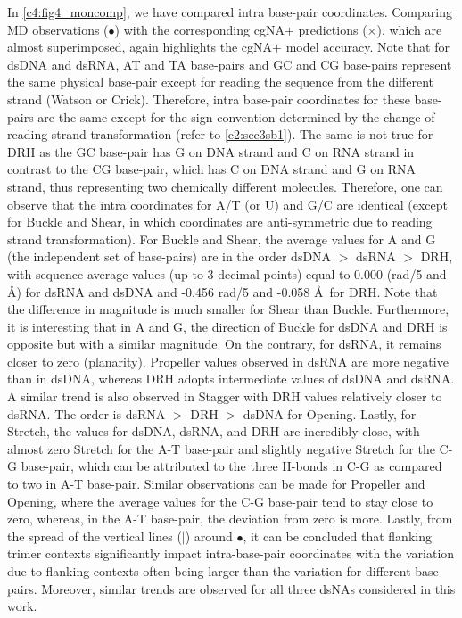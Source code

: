 In \cref{c4:fig4_moncomp}, we have compared intra base-pair coordinates. 
Comparing MD observations ($\bullet$) with the corresponding cgNA$+$ predictions ($\times$), which are almost superimposed, again highlights the cgNA$+$ model accuracy.
Note that for dsDNA and dsRNA, AT and TA base-pairs and GC and CG base-pairs represent the same physical base-pair except for reading the sequence from the different strand (Watson or Crick). 
Therefore, intra base-pair coordinates for these base-pairs are the same except for the sign convention determined by the change of reading strand transformation (refer to \cref{c2:sec3sb1}).
The same is not true for DRH as the GC base-pair has G on DNA strand and C on RNA strand in contrast to the CG base-pair, which has C on DNA strand and G on RNA strand, thus representing two chemically different molecules.
Therefore, one can observe that the intra coordinates for A/T (or U) and G/C are identical (except for Buckle and Shear, in which coordinates are anti-symmetric due to reading strand transformation).
For Buckle and Shear, the average values for A and G (the independent set of base-pairs) are in the order dsDNA $>$ dsRNA $>$ DRH, with sequence average values (up to 3 decimal points) equal to 0.000 (rad/5 and \AA) for dsRNA and dsDNA and -0.456 rad/5 and -0.058 \AA \ for DRH.
Note that  the difference in magnitude is much smaller for Shear than Buckle.
Furthermore, it is interesting that in A and G, the direction of Buckle for dsDNA and DRH is opposite but with a similar magnitude.
On the contrary, for dsRNA, it remains closer to zero (planarity).
Propeller values observed in dsRNA are more negative than in dsDNA, whereas DRH adopts intermediate values of dsDNA and dsRNA.
A similar trend is also observed in Stagger with DRH values relatively closer to dsRNA.
The order is dsRNA $>$ DRH $>$ dsDNA for Opening. Lastly, for Stretch, the values for dsDNA, dsRNA, and DRH are incredibly close, with almost zero Stretch for the A-T base-pair and slightly negative Stretch for the C-G base-pair, which can be attributed to the three H-bonds in C-G as compared to two in A-T base-pair. 
Similar observations can be made for Propeller and Opening, where the average values for the C-G base-pair tend to stay close to zero, whereas, in the A-T base-pair, the deviation from zero is more. 
Lastly, from the spread of the vertical lines ($|$) around $\bullet$, it can be concluded that flanking trimer contexts significantly impact intra-base-pair coordinates with the variation due to flanking contexts often being larger than the variation for different base-pairs.
Moreover, similar trends are observed for all three dsNAs considered in this work.

